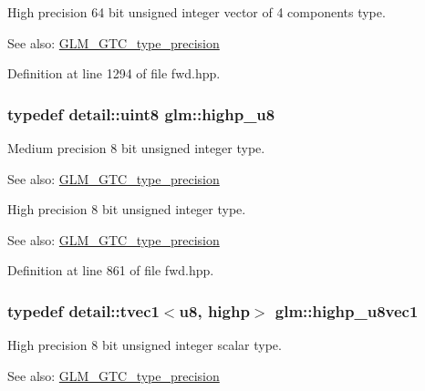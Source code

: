 High precision 64 bit unsigned integer vector of 4 components type. \begin{Desc}
\item[See also:]\hyperlink{group__gtc__type__precision}{GLM\_\-GTC\_\-type\_\-precision} \end{Desc}


Definition at line 1294 of file fwd.hpp.\hypertarget{group__gtc__type__precision_g8a60abe782749c504fb5ae51eb8b49cc}{
\subsubsection[highp\_\-u8]{\setlength{\rightskip}{0pt plus 5cm}typedef detail::uint8 {\bf glm::highp\_\-u8}}}
\label{group__gtc__type__precision_g8a60abe782749c504fb5ae51eb8b49cc}


Medium precision 8 bit unsigned integer type. \begin{Desc}
\item[See also:]\hyperlink{group__gtc__type__precision}{GLM\_\-GTC\_\-type\_\-precision}\end{Desc}
High precision 8 bit unsigned integer type. \begin{Desc}
\item[See also:]\hyperlink{group__gtc__type__precision}{GLM\_\-GTC\_\-type\_\-precision} \end{Desc}


Definition at line 861 of file fwd.hpp.\hypertarget{group__gtc__type__precision_g8e7e9156357a2b748fe39702c3bdbeec}{
\subsubsection[highp\_\-u8vec1]{\setlength{\rightskip}{0pt plus 5cm}typedef detail::tvec1$<$u8, highp$>$ {\bf glm::highp\_\-u8vec1}}}
\label{group__gtc__type__precision_g8e7e9156357a2b748fe39702c3bdbeec}


High precision 8 bit unsigned integer scalar type. \begin{Desc}
\item[See also:]\hyperlink{group__gtc__type__precision}{GLM\_\-GTC\_\-type\_\-precision} \end{Desc}


